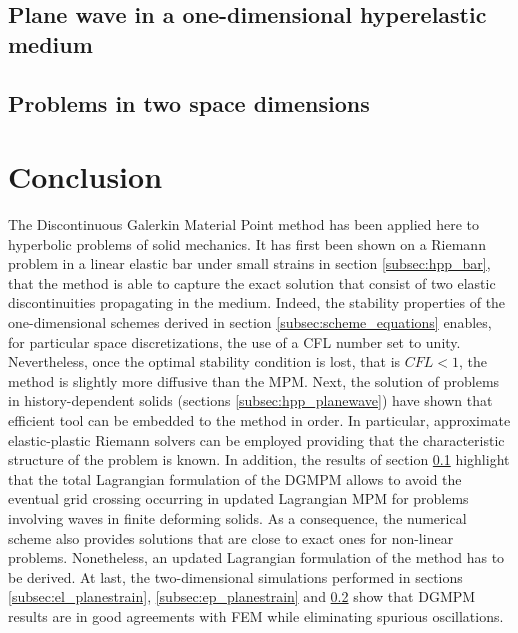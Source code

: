 \subsection{Plane wave in a one-dimensional hyperelastic medium}
\label{subsec:he_planewave}



\subsection{Problems in two space dimensions}
\label{subsec:he_plate}






\section{Conclusion}
The Discontinuous Galerkin Material Point method has been applied here to hyperbolic problems of solid mechanics.
It has first been shown on a Riemann problem in a linear elastic bar under small strains in section \ref{subsec:hpp_bar}, that the method is able to capture the exact solution that consist of two elastic discontinuities propagating in the medium.
Indeed, the stability properties of the one-dimensional schemes derived in section \ref{subsec:scheme_equations} enables, for particular space discretizations, the use of a CFL number set to unity.
Nevertheless, once the optimal stability condition is lost, that is $CFL <1$, the method is slightly more diffusive than the MPM.
Next, the solution of problems in history-dependent solids (sections \ref{subsec:hpp_planewave}) have shown that efficient tool can be embedded to the method in order.
In particular, approximate elastic-plastic Riemann solvers can be employed providing that the characteristic structure of the problem is known.
In addition, the results of section \ref{subsec:he_planewave} highlight that the total Lagrangian formulation of the DGMPM allows to avoid the eventual grid crossing occurring in updated Lagrangian MPM for problems involving waves in finite deforming solids.
As a consequence, the numerical scheme also provides solutions that are close to exact ones for non-linear problems.
Nonetheless, an updated Lagrangian formulation of the method has to be derived. 
At last, the two-dimensional simulations performed in sections \ref{subsec:el_planestrain}, \ref{subsec:ep_planestrain} and \ref{subsec:he_plate} show that DGMPM results are in good agreements with FEM while eliminating spurious oscillations.

